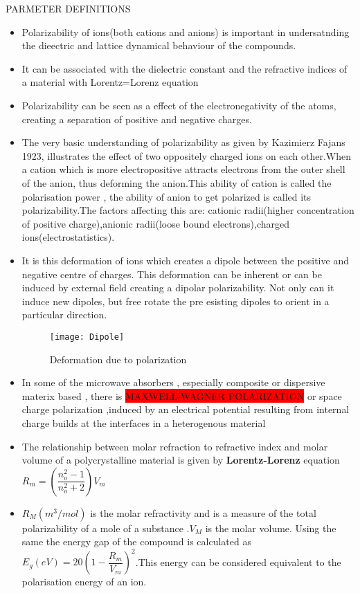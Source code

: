 \documentclass[11pt,aspect ratio=169]{beamer}
\begin{document}
\begin{frame}[t,allowframebreaks]{PARMETER DEFINITIONS}
\begin{itemize}
			
			\item Polarizability of ions(both cations and anions) is important in undersatnding the dieectric and lattice dynamical behaviour of the compounds.
			\item It can be associated with the dielectric constant and the refractive indices of a material with Lorentz=Lorenz equation
			\item Polarizability can be seen as a effect of the electronegativity of the atoms, creating a separation of positive and negative charges\cite{r10,r11}.
			\item The very basic understanding of polarizability as given by Kazimierz Fajans 1923, illustrates the effect of two oppositely charged ions on each other.When a cation which is more electropositive attracts electrons from the outer shell of the anion, thus deforming the anion.This ability of cation is called the polarisation power , the ability of anion to get polarized is called its polarizability.The factors affecting this are:
			cationic radii(higher concentration of positive charge),anionic radii(loose bound electrons),charged ions(electrostatistics).
			\item It is this deformation of ions which creates a dipole between  the positive and negative centre of charges. This deformation can be inherent or can be induced by external field creating a dipolar polarizability. Not only can it induce new dipoles, but free rotate the pre esisting dipoles to orient in a particular direction.
			\begin{figure}[H]
				\tiny
				\texttt{[image: Dipole]}
				\caption{Deformation due to polarization\cite{r11}}
				\label{fig:dipole}
			\end{figure}
			
          \item In some of the microwave absorbers , especially composite or dispersive materix based , there is \colorbox{red}{MAXWELL-WAGNER POLARIZATION} or space charge polarization ,induced by an electrical potential resulting from internal charge builds at the interfaces in a heterogenous material\cite{13}
			
			\item The relationship between molar refraction to refractive index and molar volume of a polycrystalline material is given by \textbf{Lorentz-Lorenz} equation$
			R_m = (\dfrac{n^2_o -1}{n^2_o +2 })V_m $ \cite{r9,r10}\\
			\item $R_M(m^3/mol)$ is the molar refractivity and is a measure of the total polarizability of a mole of a substance .$V_M$ is the molar volume.
			Using the same the energy gap of the compound is calculated as $E_g(eV) = 20(1- \dfrac{R_m}{V_m})^2$.This energy can be considered equivalent to the polarisation energy of an ion.
		\end{itemize}


\end{frame}
\end{document}
